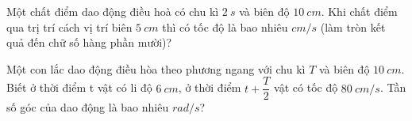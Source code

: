 \begin{ex}
	Một chất điểm dao động điều hoà có chu kì $2 \ s$ và biên độ $10 \ cm$. Khi chất điểm qua trị trí cách vị trí biên $5 \ cm$ thì có tốc độ là bao nhiêu $cm/s$ (làm tròn kết quả đến chữ số hàng phần mười)?
\end{ex}

\begin{ex}%
	Một con lắc dao động điều hòa theo phương ngang với chu kì $T$ và biên độ $10\ cm$. Biết ở thời điểm t vật có li độ $6\ cm$, ở thời điểm $t + \dfrac{T}{2}$ vật có tốc độ $80\ cm/s$. Tần số góc của dao động là bao nhiêu $rad/s$?
\end{ex}